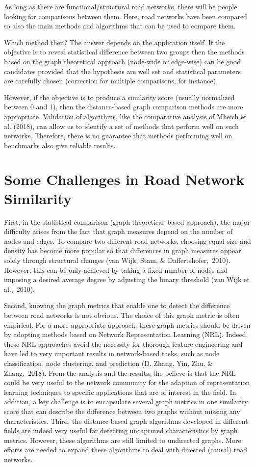 
As long as there are functional/structural road networks, there will be people looking for comparisons between them. Here, road networks have been compared so also the main methods and algorithms that can be used to compare them.

Which method then? The answer depends on the application itself. If the objective is to reveal statistical difference between two groups then the methods based on the graph theoretical approach (node-wide or edge-wise) can be good candidates provided that the hypothesis are well set and statistical parameters are carefully chosen (correction for multiple comparisons, for instance).

However, if the objective is to produce a similarity score (usually normalized between 0 and 1), then the distance-based graph comparison methods are more appropriate. Validation of algorithms, like the comparative analysis of Mheich et al. (2018), can allow us to identify a set of methods that perform well on such networks.
Therefore, there is no guarantee that methods performing well on benchmarks also give reliable results.

\section{Some Challenges in Road Network Similarity}
First, in the statistical comparison (graph theoretical–based approach), the major difficulty arises from the fact that graph measures depend on the number of nodes and edges. To compare two different road networks, choosing equal size and density has become more popular so that differences in graph measures appear solely through structural changes (van Wijk, Stam, & Daffertshofer, 2010). However, this can be only achieved by taking a fixed number of nodes and imposing a desired average degree by adjusting the binary threshold (van Wijk et al., 2010).

Second, knowing the graph metrics that enable one to detect the difference between road networks is not obvious. The choice of this graph metric is often empirical. For a more appropriate approach, these graph metrics should be driven by adopting methods based on Network Representation Learning (NRL). Indeed, these NRL approaches avoid the necessity for thorough feature engineering and have led to very important results in network-based tasks, such as node classification, node clustering, and prediction (D. Zhang, Yin, Zhu, & Zhang, 2018). From the analysis and the results, the believe is that the NRL could be very useful to the network community for the adaption of representation learning techniques to specific applications that are of interest in the field. In addition, a key challenge is to encapsulate several graph metrics in one similarity score that can describe the difference between two graphs without missing any characteristics.
Third, the distance-based graph algorithms developed in different fields are indeed very useful for detecting uncaptured characteristics by graph metrics. However, these algorithms are still limited to undirected graphs. More efforts are needed to expand these algorithms to deal with directed (causal) road networks.


